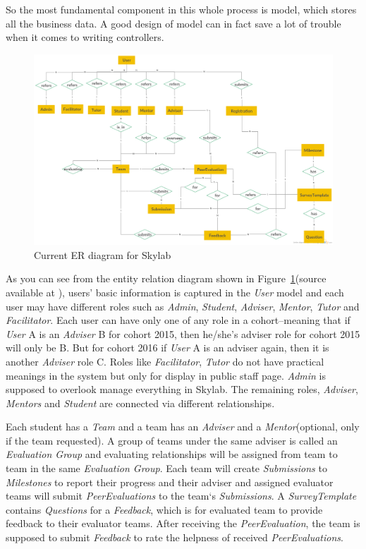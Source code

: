 So the most fundamental component in this whole process is model, which stores all the business data. A good design of model can in fact save a lot of trouble when it comes to writing controllers.

\begin{figure}[h]
  \centering
  \includegraphics[width=\textwidth]{Images/Skylab_ER.png}
  \caption{Current ER diagram for Skylab}
  \label{fig:SkylabER}
\end{figure}

As you can see from the entity relation diagram shown in Figure~\ref{fig:SkylabER}(source available at \cite{citationERSource}), users' basic information is captured in the \textit{User} model and each user may have different roles such as \textit{Admin}, \textit{Student}, \textit{Adviser}, \textit{Mentor}, \textit{Tutor} and \textit{Facilitator}. Each user can have only one of any role in a cohort--meaning that if \textit{User} A is an \textit{Adviser} B for cohort 2015, then he/she's adviser role for cohort 2015 will only be B. But for cohort 2016 if \textit{User} A is an adviser again, then it is another \textit{Adviser} role C. Roles like \textit{Facilitator}, \textit{Tutor} do not have practical meanings in the system but only for display in public staff page. \textit{Admin} is supposed to overlook manage everything in Skylab. The remaining roles, \textit{Adviser}, \textit{Mentors} and \textit{Student} are connected via different relationships.

Each student has a \textit{Team} and a team has an \textit{Adviser} and a \textit{Mentor}(optional, only if the team requested). A group of teams under the same adviser is called an \textit{Evaluation Group} and evaluating relationships will be assigned from team to team in the same \textit{Evaluation Group}. Each team will create \textit{Submissions} to \textit{Milestones} to report their progress and their adviser and assigned evaluator teams will submit \textit{PeerEvaluations} to the team`s \textit{Submissions}. A \textit{SurveyTemplate} contains \textit{Questions} for a \textit{Feedback}, which is for evaluated team to provide feedback to their evaluator teams. After receiving the \textit{PeerEvaluation}, the team is supposed to submit \textit{Feedback} to rate the helpness of received \textit{PeerEvaluations}.

